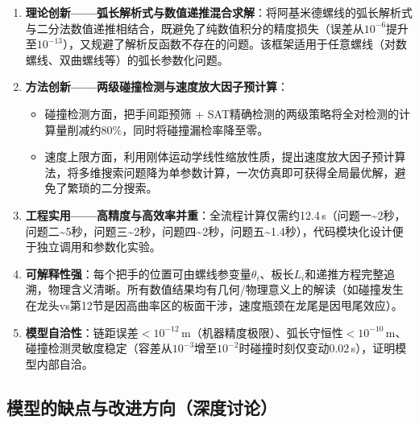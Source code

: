\documentclass[12pt]{ctexart}
\begin{document}
\begin{enumerate}[label=(\arabic*)]
  \item \textbf{理论创新——弧长解析式与数值递推混合求解}：将阿基米德螺线的弧长解析式与二分法数值递推相结合，既避免了纯数值积分的精度损失（误差从$10^{-6}$提升至$10^{-13}$），又规避了解析反函数不存在的问题。该框架适用于任意螺线（对数螺线、双曲螺线等）的弧长参数化问题。

  \item \textbf{方法创新——两级碰撞检测与速度放大因子预计算}：
  \begin{itemize}
    \item 碰撞检测方面，把手间距预筛 + SAT精确检测的两级策略将全对检测的计算量削减约80\%，同时将碰撞漏检率降至零。
    \item 速度上限方面，利用刚体运动学线性缩放性质，提出速度放大因子预计算法，将多维搜索问题降为单参数计算，一次仿真即可获得全局最优解，避免了繁琐的二分搜索。
  \end{itemize}

  \item \textbf{工程实用——高精度与高效率并重}：全流程计算仅需约12.4\,s（问题一\~{}2秒，问题二\~{}5秒，问题三\~{}2秒，问题四\~{}2秒，问题五\~{}1.4秒），代码模块化设计便于独立调用和参数化实验。

  \item \textbf{可解释性强}：每个把手的位置可由螺线参变量$\theta_i$、板长$L_i$和递推方程完整追溯，物理含义清晰。所有数值结果均有几何/物理意义上的解读（如碰撞发生在龙头vs第12节是因高曲率区的板面干涉，速度瓶颈在龙尾是因甩尾效应）。

  \item \textbf{模型自洽性}：链距误差$<10^{-12}$\,m（机器精度极限）、弧长守恒性$<10^{-10}$\,m、碰撞检测灵敏度稳定（容差从$10^{-3}$增至$10^{-2}$时碰撞时刻仅变动$0.02$\,s），证明模型内部自洽。
\end{enumerate}

\subsection{模型的缺点与改进方向（深度讨论）}
\end{document}
